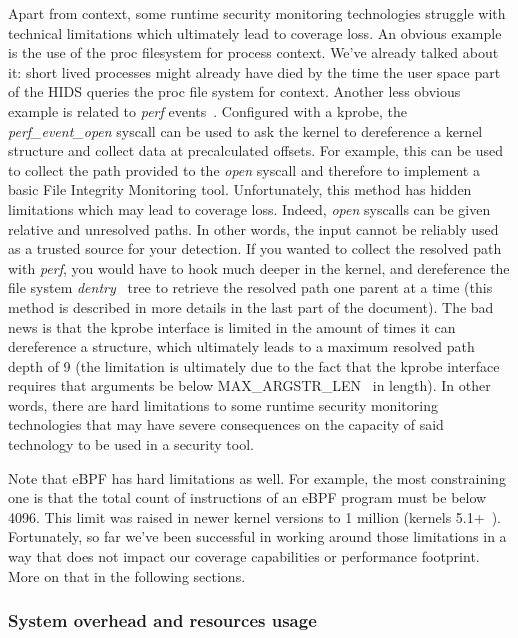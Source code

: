 Apart from context, some runtime security monitoring technologies struggle with technical limitations which ultimately lead to coverage loss.
An obvious example is the use of the proc filesystem for process context.
We’ve already talked about it: short lived processes might already have died by the time the user space part of the HIDS queries the proc file system for context.
Another less obvious example is related to \emph{perf} events~\cite{RuntimeSecurityMonitoringWithEBPF:Perf}.
Configured with a kprobe, the \emph{perf\_event\_open} syscall can be used to ask the kernel to dereference a kernel structure and collect data at precalculated offsets.
For example, this can be used to collect the path provided to the \emph{open} syscall and therefore to implement a basic File Integrity Monitoring tool.
Unfortunately, this method has hidden limitations which may lead to coverage loss.
Indeed, \emph{open} syscalls can be given relative and unresolved paths.
In other words, the input cannot be reliably used as a trusted source for your detection.
If you wanted to collect the resolved path with \emph{perf}, you would have to hook much deeper in the kernel, and dereference the file system \emph{dentry}~\cite{RuntimeSecurityMonitoringWithEBPF:Dentry} tree to retrieve the resolved path one parent at a time (this method is described in more details in the last part of the document).
The bad news is that the kprobe interface is limited in the amount of times it can dereference a structure, which ultimately leads to a maximum resolved path depth of 9 (the limitation is ultimately due to the fact that the kprobe interface requires that arguments be below MAX\_ARGSTR\_LEN~\cite{RuntimeSecurityMonitoringWithEBPF:KprobeInterface} in length).
In other words, there are hard limitations to some runtime security monitoring technologies that may have severe consequences on the capacity of said technology to be used in a security tool.

Note that eBPF has hard limitations as well.
For example, the most constraining one is that the total count of instructions of an eBPF program must be below 4096.
This limit was raised in newer kernel versions to 1 million (kernels 5.1+~\cite{RuntimeSecurityMonitoringWithEBPF:VerifierScalability}).
Fortunately, so far we’ve been successful in working around those limitations in a way that does not impact our coverage capabilities or performance footprint.
More on that in the following sections.

\subsubsection{System overhead and resources usage}

